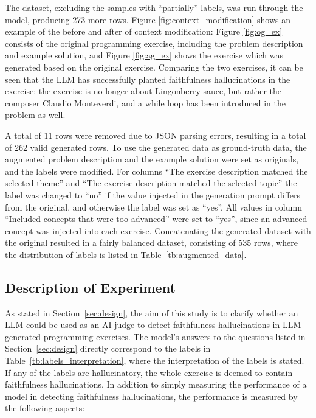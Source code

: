 \documentclass[english, 12pt, a4paper, sci, utf8, a-2b, online]{latex/definitions/aaltothesis}
\begin{document}
The dataset, excluding the samples with ``partially'' labels, was run through the model, producing 273 more rows. Figure \ref{fig:context_modification} shows an example of the before and after of context modification: Figure \ref{fig:og_ex} consists of the original programming exercise, including the problem description and example solution, and Figure \ref{fig:ag_ex} shows the exercise which was generated based on the original exercise. Comparing the two exercises, it can be seen that the LLM has successfully planted faithfulness hallucinations in the exercise: the exercise is no longer about Lingonberry sauce, but rather the composer Claudio Monteverdi, and a while loop has been introduced in the problem as well.

\begin{table}
    \centering
    
    \caption{Label distribution of the augmented dataset}
    \label{tb:augmented_data}
\end{table}

A total of 11 rows were removed due to JSON parsing errors, resulting in a total of 262 valid generated rows. To use the generated data as ground-truth data, the augmented problem description and the example solution were set as originals, and the labels were modified. For columns ``The exercise description matched the selected theme'' and ``The exercise description matched the selected topic'' the label was changed to ``no'' if the value injected in the generation prompt differs from the original, and otherwise the label was set as ``yes''. All values in column ``Included concepts that were too advanced'' were set to ``yes'', since an advanced concept was injected into each exercise. Concatenating the generated dataset with the original resulted in a fairly balanced dataset, consisting of 535 rows, where the distribution of labels is listed in Table~\ref{tb:augmented_data}.

\subsection{Description of Experiment} \label{sec:desc}

\begin{table}
    \centering
    
    \caption{Interpretation of labels}
    \label{tb:labels_interpretation}
\end{table}

As stated in Section~\ref{sec:design}, the aim of this study is to clarify whether an LLM could be used as an AI-judge to detect faithfulness hallucinations in LLM-generated programming exercises. The model's answers to the questions listed in Section~\ref{sec:design} directly correspond to the labels in Table~\ref{tb:labels_interpretation}, where the interpretation of the labels is stated. If any of the labels are hallucinatory, the whole exercise is deemed to contain faithfulness hallucinations. In addition to simply measuring the performance of a model in detecting faithfulness hallucinations, the performance is measured by the following aspects:
\end{document}
